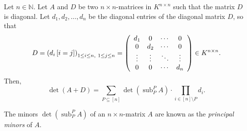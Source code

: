 \begin{theorem}
\label{thm.det.det(A+D)}Let $n\in\mathbb{N}$. Let $A$ and $D$ be two $n\times
n$-matrices in $K^{n\times n}$ such that the matrix $D$ is diagonal. Let
$d_{1},d_{2},\ldots,d_{n}$ be the diagonal entries of the diagonal matrix $D$,
so that%
\[
D=\left(  d_{i}\left[  i=j\right]  \right)  _{1\leq i\leq n,\ 1\leq j\leq
n}=\left(
\begin{array}
[c]{cccc}%
d_{1} & 0 & \cdots & 0\\
0 & d_{2} & \cdots & 0\\
\vdots & \vdots & \ddots & \vdots\\
0 & 0 & \cdots & d_{n}%
\end{array}
\right)  \in K^{n\times n}.
\]
Then,%
\[
\det\left(  A+D\right)  =\sum_{P\subseteq\left[  n\right]  }\det\left(
\operatorname*{sub}\nolimits_{P}^{P}A\right)  \cdot\prod_{i\in\left[
n\right]  \setminus P}d_{i}.
\]

\end{theorem}

The minors $\det\left(  \operatorname*{sub}\nolimits_{P}^{P}A\right)  $ of an
$n\times n$-matrix $A$ are known as the \emph{principal minors} of $A$.


